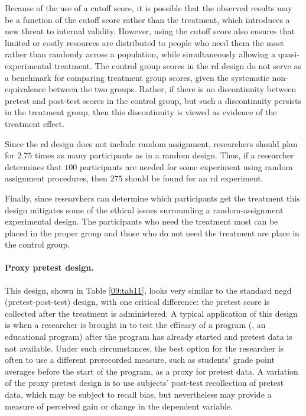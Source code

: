 Because of the use of a cutoff score, it is possible that the observed results may be a function of the cutoff score rather than the treatment, which introduces a new threat to internal validity. However, using the cutoff score also ensures that limited or costly resources are distributed to people who need them the most rather than randomly across a population, while simultaneously allowing a quasi-experimental treatment. The control group scores in the \gls{rd} design do not serve as a benchmark for comparing treatment group scores, given the systematic non-equivalence between the two groups. Rather, if there is no discontinuity between pretest and post-test scores in the control group, but such a discontinuity persists in the treatment group, then this discontinuity is viewed as evidence of the treatment effect.

Since the \gls{rd} design does not include random assignment, researchers should plan for $ 2.75 $ times as many participants as in a random design. Thus, if a researcher determines that $ 100 $ participants are needed for some experiment using random assignment procedures, then $ 275 $ should be found for an \gls{rd} experiment.

Finally, since researchers can determine which participants get the treatment this design mitigates some of the ethical issues surrounding a random-assignment experimental design. The participants who need the treatment most can be placed in the proper group and those who do not need the treatment are place in the control group.

\paragraph{Proxy pretest design.} This design, shown in Table \ref{09:tab11}, looks very similar to the standard \gls{negd} (pretest-post-test) design, with one critical difference: the pretest score is collected after the treatment is administered. A typical application of this design is when a researcher is brought in to test the efficacy of a program (\eg, an educational program) after the program has already started and pretest data is not available. Under such circumstances, the best option for the researcher is often to use a different prerecorded measure, such as students' grade point averages before the start of the program, as a proxy for pretest data. A variation of the proxy pretest design is to use subjects' post-test recollection of pretest data, which may be subject to recall bias, but nevertheless may provide a measure of perceived gain or change in the dependent variable.

